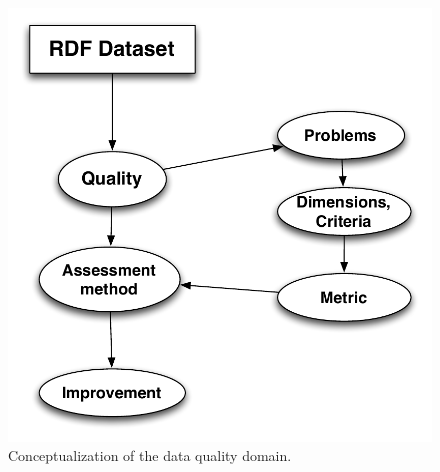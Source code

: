 \begin{figure}
\includegraphics[scale=0.5]{Mindmap.pdf}
\caption{Conceptualization of the data quality domain.}
\label{fig:mindmap}
\end{figure}

